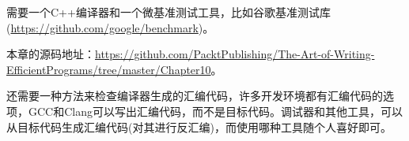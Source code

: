
需要一个C++编译器和一个微基准测试工具，比如谷歌基准测试库(\url{https://github.com/google/benchmark})。

本章的源码地址：\url{https://github.com/PacktPublishing/The-Art-of-Writing-EfficientPrograms/tree/master/Chapter10}。

还需要一种方法来检查编译器生成的汇编代码，许多开发环境都有汇编代码的选项，GCC和Clang可以写出汇编代码，而不是目标代码。调试器和其他工具，可以从目标代码生成汇编代码(对其进行反汇编)，而使用哪种工具随个人喜好即可。